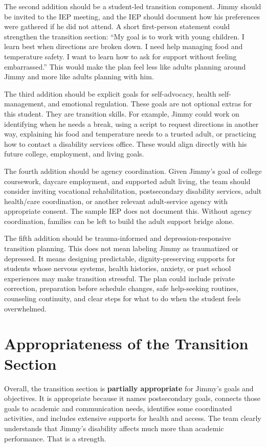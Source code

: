 \documentclass[11pt]{article}
\begin{document}
The second addition should be a student-led transition component. Jimmy should be invited to the IEP meeting, and the IEP should document how his preferences were gathered if he did not attend. A short first-person statement could strengthen the transition section: ``My goal is to work with young children. I learn best when directions are broken down. I need help managing food and temperature safety. I want to learn how to ask for support without feeling embarrassed.'' This would make the plan feel less like adults planning around Jimmy and more like adults planning with him.

The third addition should be explicit goals for self-advocacy, health self-management, and emotional regulation. These goals are not optional extras for this student. They are transition skills. For example, Jimmy could work on identifying when he needs a break, using a script to request directions in another way, explaining his food and temperature needs to a trusted adult, or practicing how to contact a disability services office. These would align directly with his future college, employment, and living goals.

The fourth addition should be agency coordination. Given Jimmy's goal of college coursework, daycare employment, and supported adult living, the team should consider inviting vocational rehabilitation, postsecondary disability services, adult health/care coordination, or another relevant adult-service agency with appropriate consent. The sample IEP does not document this. Without agency coordination, families can be left to build the adult support bridge alone.

The fifth addition should be trauma-informed and depression-responsive transition planning. This does not mean labeling Jimmy as traumatized or depressed. It means designing predictable, dignity-preserving supports for students whose nervous systems, health histories, anxiety, or past school experiences may make transition stressful. The plan could include private correction, preparation before schedule changes, safe help-seeking routines, counseling continuity, and clear steps for what to do when the student feels overwhelmed.

\section{Appropriateness of the Transition Section}

Overall, the transition section is \textbf{partially appropriate} for Jimmy's goals and objectives. It is appropriate because it names postsecondary goals, connects those goals to academic and communication needs, identifies some coordinated activities, and includes extensive supports for health and access. The team clearly understands that Jimmy's disability affects much more than academic performance. That is a strength.
\end{document}
